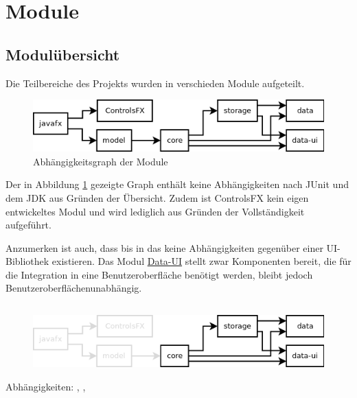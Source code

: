 
\newcommand{\depBox}[1]{
	\begin{adjustbox}{minipage=0.90\textwidth,margin=0 \smallskipamount,center}
		Abhängigkeiten:	 #1
	\end{adjustbox} ~\\
}

\section{Module}
\subsection{Modulübersicht}
Die Teilbereiche des Projekts wurden in verschieden Module aufgeteilt.

\begin{figure}[H]
	\centering
	\includegraphics[width=.8\textwidth]{module_dependencies.png}
	\caption{Abhängigkeitsgraph der Module}
	\label{mod_dep_view}
\end{figure}

Der in Abbildung \ref{mod_dep_view} gezeigte Graph enthält keine Abhängigkeiten nach JUnit und
dem JDK aus Gründen der Übersicht. Zudem ist ControlsFX \cite{controlsfx} kein eigen
entwickeltes Modul und wird lediglich aus Gründen der Vollständigkeit aufgeführt.

Anzumerken ist auch, dass bis in das  keine Abhängigkeiten
gegenüber einer UI-Bibliothek existieren. Das Modul \hyperref[mod_data-ui]{Data-UI} stellt
zwar Komponenten bereit, die für die Integration in eine Benutzeroberfläche benötigt werden,
bleibt jedoch Benutzeroberflächenunabhängig.


\subsection{\textModCore}
\label{\textModCore}
\begin{figure}[H]
	\centering
	\includegraphics[width=.8\textwidth]{module_dependencies_core.png}
\end{figure}
\depBox{, , \refLongP{\textModStorage}}

